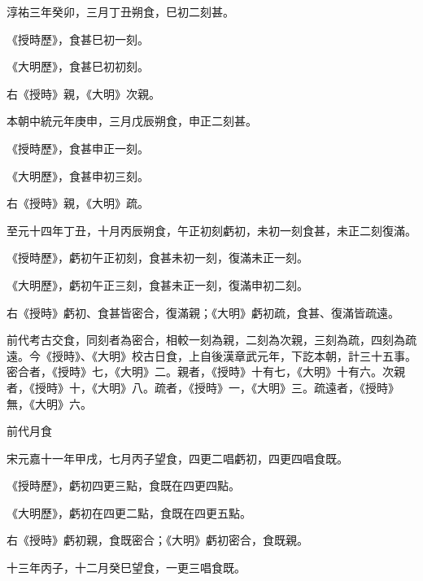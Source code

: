\begin{pinyinscope}
 淳祐三年癸卯，三月丁丑朔食，巳初二刻甚。



 《授時歷》，食甚巳初一刻。



 《大明歷》，食甚巳初初刻。



 右《授時》親，《大明》次親。



 本朝中統元年庚申，三月戊辰朔食，申正二刻甚。



 《授時歷》，食甚申正一刻。



 《大明歷》，食甚申初三刻。



 右《授時》親，《大明》疏。



 至元十四年丁丑，十月丙辰朔食，午正初刻虧初，未初一刻食甚，未正二刻復滿。



 《授時歷》，虧初午正初刻，食甚未初一刻，復滿未正一刻。



 《大明歷》，虧初午正三刻，食甚未正一刻，復滿申初二刻。



 右《授時》虧初、食甚皆密合，復滿親；《大明》虧初疏，食甚、復滿皆疏遠。



 前代考古交食，同刻者為密合，相較一刻為親，二刻為次親，三刻為疏，四刻為疏遠。今《授時》、《大明》校古日食，上自後漢章武元年，下訖本朝，計三十五事。密合者，《授時》七，《大明》二。親者，《授時》十有七，《大明》十有六。次親者，《授時》十，《大明》八。疏者，《授時》一，《大明》三。疏遠者，《授時》無，《大明》六。



 前代月食



 宋元嘉十一年甲戌，七月丙子望食，四更二唱虧初，四更四唱食既。



 《授時歷》，虧初四更三點，食既在四更四點。



 《大明歷》，虧初在四更二點，食既在四更五點。



 右《授時》虧初親，食既密合；《大明》虧初密合，食既親。



 十三年丙子，十二月癸巳望食，一更三唱食既。




\end{pinyinscope}
